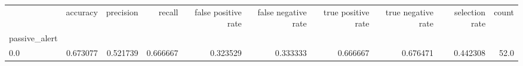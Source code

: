 \begin{tabular}{lrrrrrrrrr}
\toprule
{} &  accuracy &  precision &    recall &  false positive rate &  false negative rate &  true positive rate &  true negative rate &  selection rate &  count \\
passive\_alert &           &            &           &                      &                      &                     &                     &                 &        \\
\midrule
0.0           &  0.673077 &   0.521739 &  0.666667 &             0.323529 &             0.333333 &            0.666667 &            0.676471 &        0.442308 &   52.0 \\
\bottomrule
\end{tabular}
